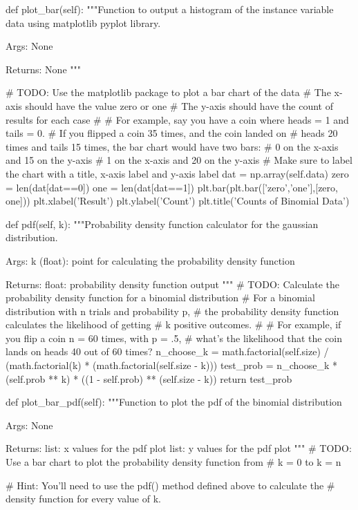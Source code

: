 \begin{python}
		def plot_bar(self):
			"""Function to output a histogram of the instance variable data using 
			matplotlib pyplot library.
			
			Args:
			None
			
			Returns:
			None
			"""
			
			# TODO: Use the matplotlib package to plot a bar chart of the data
			#       The x-axis should have the value zero or one
			#       The y-axis should have the count of results for each case
			#
			#       For example, say you have a coin where heads = 1 and tails = 0.
			#       If you flipped a coin 35 times, and the coin landed on
			#       heads 20 times and tails 15 times, the bar chart would have two 	bars:
			#       0 on the x-axis and 15 on the y-axis
			#       1 on the x-axis and 20 on the y-axis
			#       Make sure to label the chart with a title, x-axis label and 	y-axis label
			dat = np.array(self.data)
			zero = len(dat[dat==0])
			one = len(dat[dat==1])
			plt.bar(plt.bar(['zero','one'],[zero, one]))
			plt.xlabel('Result')
			plt.ylabel('Count')
			plt.title('Counts of Binomial Data')
		
		def pdf(self, k):
			"""Probability density function calculator for the gaussian 	distribution.
			
			Args:
			k (float): point for calculating the probability density function
			
			Returns:
			float: probability density function output
			"""
			# TODO: Calculate the probability density function for a binomial 	distribution
			#  For a binomial distribution with n trials and probability p, 
			#  the probability density function calculates the likelihood of getting
			#   k positive outcomes. 
			# 
			#   For example, if you flip a coin n = 60 times, with p = .5,
			#   what's the likelihood that the coin lands on heads 40 out of 60 	times?
			n_choose_k = math.factorial(self.size) / (math.factorial(k) * 	(math.factorial(self.size - k)))
			test_prob = n_choose_k * (self.prob ** k) * ((1 - self.prob) ** 	(self.size - k))
			return test_prob
		
		def plot_bar_pdf(self):
			"""Function to plot the pdf of the binomial distribution
			
			Args:
			None
			
			Returns:
			list: x values for the pdf plot
			list: y values for the pdf plot
			"""
			# TODO: Use a bar chart to plot the probability density function from
			# k = 0 to k = n
			
			#   Hint: You'll need to use the pdf() method defined above to 	calculate the
			#   density function for every value of k.
			

\end{python}
